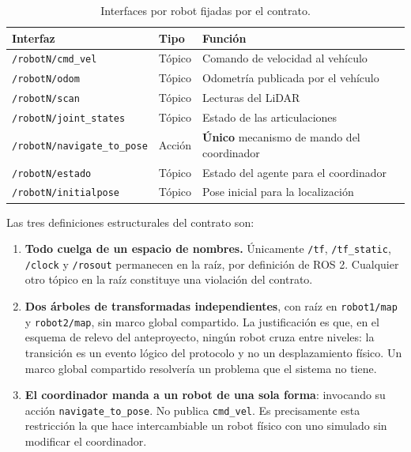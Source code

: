 \documentclass[12pt,letterpaper]{article}
\begin{document}
\begin{table}[H]
    \centering
    \small
    \caption{Interfaces por robot fijadas por el contrato.}
    \label{tab:contrato}
    \begin{tabular}{@{}llp{6.4cm}@{}}
        \toprule
        \textbf{Interfaz} & \textbf{Tipo} & \textbf{Función} \\ \midrule
        \texttt{/robotN/cmd\_vel}   & Tópico  & Comando de velocidad al vehículo \\
        \texttt{/robotN/odom}       & Tópico  & Odometría publicada por el vehículo \\
        \texttt{/robotN/scan}       & Tópico  & Lecturas del LiDAR \\
        \texttt{/robotN/joint\_states} & Tópico & Estado de las articulaciones \\
        \texttt{/robotN/navigate\_to\_pose} & Acción & \textbf{Único} mecanismo de mando del coordinador \\
        \texttt{/robotN/estado}     & Tópico  & Estado del agente para el coordinador \\
        \texttt{/robotN/initialpose} & Tópico & Pose inicial para la localización \\ \bottomrule
    \end{tabular}
\end{table}

Las tres definiciones estructurales del contrato son:

\begin{enumerate}[leftmargin=*]
    \item \textbf{Todo cuelga de un espacio de nombres.} Únicamente \texttt{/tf}, \texttt{/tf\_static}, \texttt{/clock} y \texttt{/rosout} permanecen en la raíz, por definición de ROS 2. Cualquier otro tópico en la raíz constituye una violación del contrato.
    \item \textbf{Dos árboles de transformadas independientes}, con raíz en \texttt{robot1/map} y \texttt{robot2/map}, sin marco global compartido. La justificación es que, en el esquema de relevo del anteproyecto, ningún robot cruza entre niveles: la transición es un evento lógico del protocolo y no un desplazamiento físico. Un marco global compartido resolvería un problema que el sistema no tiene.
    \item \textbf{El coordinador manda a un robot de una sola forma}: invocando su acción \texttt{navigate\_to\_pose}. No publica \texttt{cmd\_vel}. Es precisamente esta restricción la que hace intercambiable un robot físico con uno simulado sin modificar el coordinador.
\end{enumerate}
\end{document}
